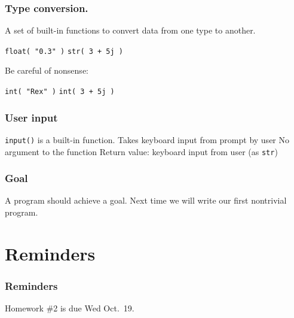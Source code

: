 \documentclass[11pt]{beamer}
\begin{document}
\begin{frame}
  \frametitle{Type conversion.}
  \Enlarge

  \begin{itemize}
  \myitem  A set of built-in functions to convert data from one type to another. \pause
    \begin{itemize}
    \mysubitem  \texttt{float( "0.3" )}
    \mysubitem  \texttt{str( 3 + 5j )}
    \end{itemize} \pause
  \myitem  Be careful of nonsense:
    \begin{itemize}
    \mysubitem  \texttt{int( "Rex" )}
    \mysubitem  \texttt{int( 3 + 5j )}
    \end{itemize}
  \end{itemize}
\end{frame}

\begin{frame}
  \frametitle{User input}
  \Enlarge

  \begin{itemize}
  \myitem  \texttt{input()} is a built-in function. \pause
  \myitem  Takes keyboard input from prompt by user \pause
  \myitem  No argument to the function \pause
  \myitem  Return value:  keyboard input from user (as \texttt{str})
  \end{itemize}
\end{frame}

\begin{frame}
  \frametitle{Goal}
  \Enlarge

  \begin{itemize}
  \myitem  A program should achieve a goal. \pause
  \myitem  Next time we will write our first nontrivial program.
  \end{itemize}
\end{frame}

\section{Reminders}

\begin{frame}
  \frametitle{Reminders}
  \Enlarge

  \begin{itemize}
  \myitem Homework \#2 is due Wed Oct.\ 19. 
  \end{itemize}
\end{frame}
\end{document}
